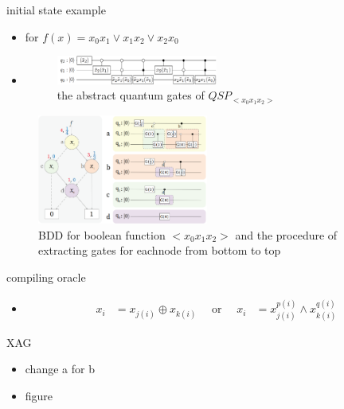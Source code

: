 \begin{frame}{initial state example}
  \begin{itemize}
    \item for $f(x)=x_0x_1\vee x_1x_2\vee x_2x_0$
    \item 
    \begin{figure}[htbq]
      \centering
      \includegraphics[width=0.5\textwidth]{figure/qsp_example.png}
      \caption{the abstract quantum gates of $QSP_{<x_0x_1x_2>}$} 
      \label{fig-qsp-example}
    \end{figure}
  \end{itemize}
\end{frame}
\begin{frame}
  \begin{figure}[htbq]
    \centering
    \includegraphics[width=0.5\textwidth]{figure/qsp_circuit.png}
    \caption{BDD  for boolean function $<x_0x_1x_2>$ and  the  procedure  of  extracting  gates  for  eachnode from bottom to top} 
    \label{fig-qsp-example-circuit}
  \end{figure}
\end{frame}
\begin{frame}{compiling oracle}
  \begin{itemize}
    \item 
    \begin{align}
      x_{i} & = x_{j(i)} \oplus x_{k(i)} \quad \text { or } \quad x_{i} & = x_{j(i)}^{p(i)} \wedge x_{k(i)}^{q(i)}
    \end{align}
  \end{itemize}
\end{frame}
\begin{frame}{XAG}
  \begin{itemize}
    \item change a for b
    \item figure
  \end{itemize}
\end{frame}
